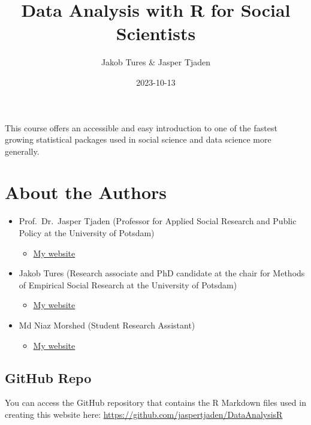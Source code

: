 \documentclass[
]{book}
\title{Data Analysis with R for Social Scientists}
\author{Jakob Tures \& Jasper Tjaden}
\date{2023-10-13}
\providecommand{\tightlist}{%
  \setlength{\itemsep}{0pt}\setlength{\parskip}{0pt}}
\begin{document}
\maketitle

{
\setcounter{tocdepth}{1}
\tableofcontents
}
This course offers an accessible and easy introduction to one of the fastest growing statistical packages used in social science and data science more generally.

\hypertarget{about-the-authors}{%
\chapter*{About the Authors}\label{about-the-authors}}

\begin{itemize}
\tightlist
\item
  Prof.~Dr.~Jasper Tjaden (Professor for Applied Social Research and Public Policy at the University of Potsdam)

  \begin{itemize}
  \tightlist
  \item
    \href{https://jaspertjaden.com}{My website}
  \end{itemize}
\item
  Jakob Tures (Research associate and PhD candidate at the chair for Methods of Empirical Social Research at the University of Potsdam)

  \begin{itemize}
  \tightlist
  \item
    \href{https://www.uni-potsdam.de/de/soziologie-methoden/team/jakob-tures}{My website}
  \end{itemize}
\item
  Md Niaz Morshed (Student Research Assistant)

  \begin{itemize}
  \tightlist
  \item
    \href{https://n1az.github.io/}{My website}
  \end{itemize}
\end{itemize}

\hypertarget{github-repo}{%
\section*{GitHub Repo}\label{github-repo}}

You can access the GitHub repository that contains the R Markdown files used in creating this website here: \url{https://github.com/jaspertjaden/DataAnalysisR}
\end{document}
